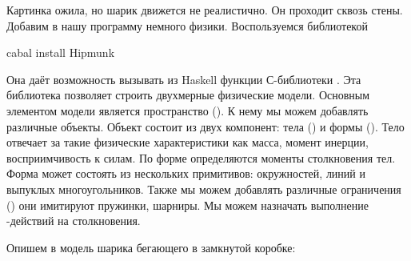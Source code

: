 Картинка ожила, но шарик движется не реалистично. Он проходит сквозь
стены. Добавим в нашу программу немного физики. Воспользуемся
библиотекой 


\begin{code}
cabal install Hipmunk
\end{code}

Она даёт возможность вызывать из Haskell функции С-библиотеки
. Эта библиотека позволяет строить двухмерные физические
модели. Основным элементом модели является пространство (). К
нему мы можем добавлять различные объекты. Объект состоит из двух
компонент: тела () и формы (). Тело отвечает за такие
физические характеристики как масса, момент инерции, восприимчивость к
силам. По форме определяются моменты столкновения тел. Форма может
состоять из нескольких примитивов: окружностей, линий и выпуклых
многоугольников. Также мы можем добавлять различные ограничения
() они имитируют пружинки, шарниры. Мы можем назначать
выполнение -действий на столкновения.

Опишем в  модель шарика бегающего в замкнутой коробке:


